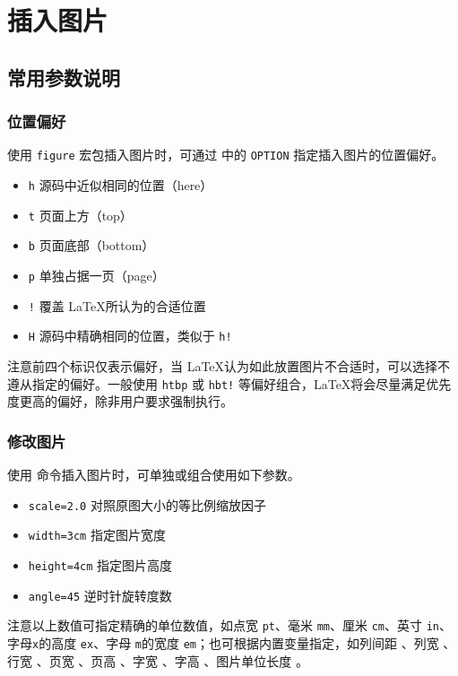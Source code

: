 \section{插入图片}
\subsection{常用参数说明}
\subsubsection{位置偏好}
使用 \texttt{figure} 宏包插入图片时，可通过 \latex{\begin{figure}[OPTION]} 中的 \texttt{OPTION} 指定插入图片的位置偏好。

\begin{itemize}
    \item \texttt{h} 源码中近似相同的位置（here）
    \item \texttt{t} 页面上方（top）
    \item \texttt{b} 页面底部（bottom）
    \item \texttt{p} 单独占据一页（page）
    \item \texttt{!} 覆盖 \LaTeX 所认为的合适位置
    \item \texttt{H} 源码中精确相同的位置，类似于 \texttt{h!}
\end{itemize}

注意前四个标识仅表示偏好，当 \LaTeX 认为如此放置图片不合适时，可以选择不遵从指定的偏好。一般使用 \texttt{htbp} 或 \texttt{hbt!} 等偏好组合，\LaTeX 将会尽量满足优先度更高的偏好，除非用户要求强制执行。

\subsubsection{修改图片}
使用  命令插入图片时，可单独或组合使用如下参数。

\begin{itemize}
    \item \texttt{scale=2.0} 对照原图大小的等比例缩放因子
    \item \texttt{width=3cm} 指定图片宽度
    \item \texttt{height=4cm} 指定图片高度
    \item \texttt{angle=45} 逆时针旋转度数
\end{itemize}

注意以上数值可指定精确的单位数值，如点宽 \texttt{pt}、毫米 \texttt{mm}、厘米 \texttt{cm}、英寸 \texttt{in}、字母\texttt{x}的高度 \texttt{ex}、字母 \texttt{m}的宽度 \texttt{em}；也可根据内置变量指定，如列间距 \latex{\columnsep}、列宽 \latex{\columnwidth}、行宽 \latex{\linewidth}、页宽 \latex{\paperwidth}、页高 \latex{\paperheight}、字宽 \latex{\textwidth}、字高 \latex{\textheight}、图片单位长度 \latex{\unitleght}。


